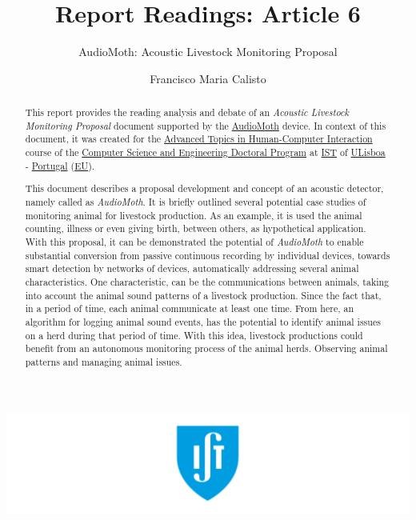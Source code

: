 \documentclass[sigchi]{acmart}
\begin{document}
\title{Report Readings: Article 6}
\subtitle{AudioMoth: Acoustic Livestock Monitoring Proposal}

\author{Francisco Maria Calisto}

\renewcommand{\shortauthors}{Calisto}


\begin{abstract}

This report provides the reading analysis and debate of an \textit{Acoustic Livestock Monitoring Proposal} document supported by the \hyperlink{https://www.openacousticdevices.info/audiomoth}{AudioMoth} device.
In context of this document, it was created for the \hyperlink{https://fenix.tecnico.ulisboa.pt/disciplinas/TAIP-M/2018-2019/1-semestre}{Advanced Topics in Human-Computer Interaction} course of the \hyperlink{https://fenix.tecnico.ulisboa.pt/cursos/deic/curriculo}{Computer Science and Engineering Doctoral Program} at \hyperlink{https://tecnico.ulisboa.pt/en/}{IST} of \hyperlink{https://www.ulisboa.pt/}{ULisboa} - \hyperlink{https://www.portugal.gov.pt/en/}{Portugal} (\hyperlink{https://europa.eu}{EU}).

This document describes a proposal development and concept of an acoustic detector, namely called as \textit{AudioMoth}.
It is briefly outlined several potential case studies of monitoring animal for livestock production.
As an example, it is used the animal counting, illness or even giving birth, between others, as hypothetical application.
With this proposal, it can be demonstrated the potential of \textit{AudioMoth} to enable substantial conversion from passive continuous recording by individual devices, towards smart detection by networks of devices, automatically addressing several animal characteristics.
One characteristic, can be the communications between animals, taking into account the animal sound patterns of a livestock production.
Since the fact that, in a period of time, each animal communicate at least one time.
From here, an algorithm for logging animal sound events, has the potential to identify animal issues on a herd during that period of time.
With this idea, livestock productions could benefit from an autonomous monitoring process of the animal herds.
Observing animal patterns and managing animal issues.

\end{abstract}

\begin{teaserfigure}
\includegraphics[width=\textwidth]{teaser}
\end{teaserfigure}


\maketitle





\end{document}
